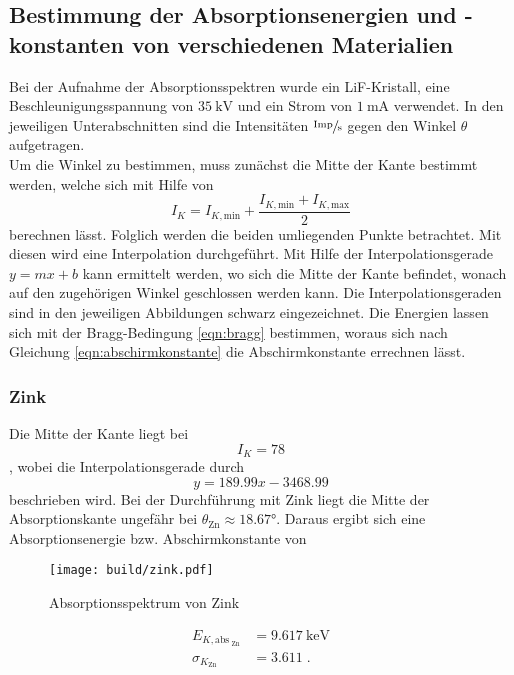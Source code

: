 \subsection{Bestimmung der Absorptionsenergien und -konstanten von verschiedenen Materialien}
Bei der Aufnahme der Absorptionsspektren wurde ein LiF-Kristall, eine Beschleunigungsspannung von $\SI{35}{\kilo\volt}$ und ein Strom von $\SI{1}{\milli\ampere}$
verwendet. 
In den jeweiligen Unterabschnitten sind die Intensitäten $\sfrac{\text{Imp}}{\si{\second}}$ gegen den Winkel $\theta$ aufgetragen. \\
Um die Winkel zu bestimmen, muss zunächst die Mitte der Kante bestimmt werden, welche sich mit Hilfe von
\begin{equation}
    I_K = I_{K, \text{min}} + \frac{I_{K, \text{min}} + I_{K, \text{max}}}{2}
\end{equation}
berechnen lässt. 
Folglich werden die beiden umliegenden Punkte betrachtet. 
Mit diesen wird eine Interpolation durchgeführt. 
Mit Hilfe der Interpolationsgerade $y = mx+b$ kann ermittelt werden, wo sich die Mitte der Kante befindet, wonach auf den zugehörigen Winkel 
geschlossen werden kann.
Die Interpolationsgeraden sind in den jeweiligen Abbildungen schwarz eingezeichnet. 
Die Energien lassen sich mit der Bragg-Bedingung \eqref{eqn:bragg} bestimmen, woraus sich nach Gleichung \eqref{eqn:abschirmkonstante} 
die Abschirmkonstante errechnen lässt.
\subsubsection{Zink}
Die Mitte der Kante liegt bei 
\begin{equation*}
    I_K = 78
\end{equation*}
, wobei die Interpolationsgerade durch 
\begin{equation*}
    y = 189.99 x - 3468.99
\end{equation*}
beschrieben wird.
Bei der Durchführung mit Zink liegt die Mitte der Absorptionskante ungefähr bei $\theta_\text{Zn} \approx \ang{18.67;;}$. Daraus ergibt sich eine Absorptionsenergie bzw. Abschirmkonstante von 
\begin{figure}
    \centering
    \caption{Absorptionsspektrum von Zink}
    \label{fig:zink}
    \texttt{[image: build/zink.pdf]}
\end{figure}
\begin{align*}
    E_{K, \text{abs}_\text{ Zn}}  &= \SI{9.617}{\kilo\electronvolt} \\
    \sigma_{K_\text{Zn}}         &= \num{3.611} \; \text{.}
\end{align*}
\FloatBarrier
